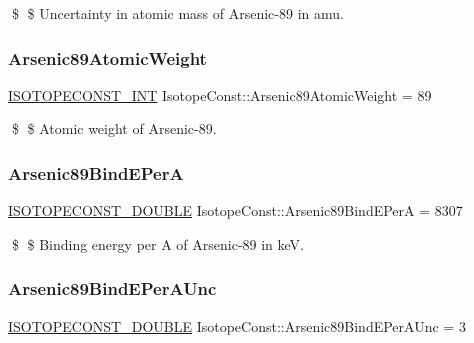 \$ \$ Uncertainty in atomic mass of Arsenic-\/89 in amu. \mbox{\label{group___isotope_const-_arsenic-_as89_ga988b5aa99a58d96c588738e5e512be05}} 
\subsubsection{\texorpdfstring{Arsenic89\+Atomic\+Weight}{Arsenic89AtomicWeight}}
{\footnotesize\ttfamily \mbox{\hyperlink{group___isotope_const-_macros_ga5f18360b3e99483a35c32d789e62621c}{I\+S\+O\+T\+O\+P\+E\+C\+O\+N\+S\+T\+\_\+\+I\+NT}} Isotope\+Const\+::\+Arsenic89\+Atomic\+Weight = 89}

\$ \$ Atomic weight of Arsenic-\/89. \mbox{\label{group___isotope_const-_arsenic-_as89_ga98f7bf994ea20ee47c3143f4e8092135}} 
\subsubsection{\texorpdfstring{Arsenic89\+Bind\+E\+PerA}{Arsenic89BindEPerA}}
{\footnotesize\ttfamily \mbox{\hyperlink{group___isotope_const-_macros_ga8f45a7272ce02c0b4c65c44636ed719a}{I\+S\+O\+T\+O\+P\+E\+C\+O\+N\+S\+T\+\_\+\+D\+O\+U\+B\+LE}} Isotope\+Const\+::\+Arsenic89\+Bind\+E\+PerA = 8307}

\$ \$ Binding energy per A of Arsenic-\/89 in keV. \mbox{\label{group___isotope_const-_arsenic-_as89_ga2434a11150b483e1e577b72fdc2a460a}} 
\subsubsection{\texorpdfstring{Arsenic89\+Bind\+E\+Per\+A\+Unc}{Arsenic89BindEPerAUnc}}
{\footnotesize\ttfamily \mbox{\hyperlink{group___isotope_const-_macros_ga8f45a7272ce02c0b4c65c44636ed719a}{I\+S\+O\+T\+O\+P\+E\+C\+O\+N\+S\+T\+\_\+\+D\+O\+U\+B\+LE}} Isotope\+Const\+::\+Arsenic89\+Bind\+E\+Per\+A\+Unc = 3}

